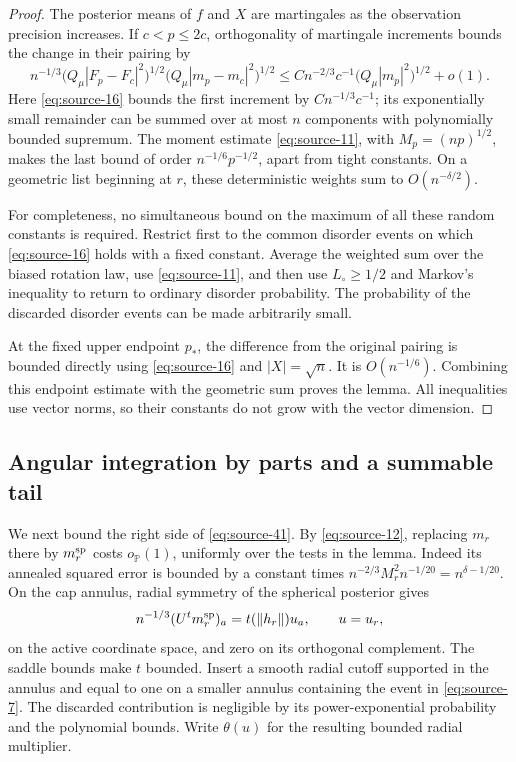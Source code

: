 \begin{proof}
The posterior means of $f$ and $X$ are martingales as the observation
precision increases.  If $c<p\leq2c$, orthogonality of martingale
increments bounds the change in their pairing by
\[
 n^{-1/3}
 \big(Q_\mu|F_p-F_c|^2\big)^{1/2}
 \big(Q_\mu|m_p-m_c|^2\big)^{1/2}
 \leq Cn^{-2/3}c^{-1}
 \big(Q_\mu|m_p|^2\big)^{1/2}+o(1).
\]
Here \eqref{eq:source-16} bounds the first increment by
$Cn^{-1/3}c^{-1}$; its exponentially small remainder can be summed
over at most $n$ components with polynomially bounded supremum.
The moment estimate \eqref{eq:source-11}, with $M_p=(np)^{1/2}$,
makes the last bound of order
$n^{-1/6}p^{-1/2}$, apart from tight constants.
On a geometric list beginning at $r$, these deterministic weights sum
to $O(n^{-\delta/2})$.

For completeness, no simultaneous bound on the maximum of all these
random constants is required.  Restrict first to the common disorder
events on which \eqref{eq:source-16} holds with a fixed constant.
Average the weighted sum over the biased rotation law, use
\eqref{eq:source-11}, and then use $L_\circ\geq1/2$ and Markov's
inequality to return to ordinary disorder probability.  The probability
of the discarded disorder events can be made arbitrarily small.

At the fixed upper endpoint $p_*$, the difference from the original
pairing is bounded directly using \eqref{eq:source-16} and
$|X|=\sqrt n$.  It is $O(n^{-1/6})$.  Combining this endpoint estimate
with the geometric sum proves the lemma.  All inequalities use vector
norms, so their constants do not grow with the vector dimension.
\end{proof}

\subsection{Angular integration by parts and a summable tail}

We next bound the right side of \eqref{eq:source-41}.  By
\eqref{eq:source-12}, replacing $m_r$ there by $m_r^{\rm sp}$ costs
$o_{\mathbb P}(1)$, uniformly over the tests in the lemma.  Indeed its
annealed squared error is bounded by a constant times
$n^{-2/3}M_r^2n^{-1/20}=n^{\delta-1/20}$.
On the cap annulus, radial symmetry of the spherical posterior gives
\[
 n^{-1/3}(U^tm_r^{\rm sp})_a=t(\|h_r\|)u_a,
 \qquad u=u_r,
\]
on the active coordinate space, and zero on its orthogonal complement.
The saddle bounds make $t$ bounded.  Insert a smooth radial cutoff
supported in the annulus and equal to one on a smaller annulus containing
the event in \eqref{eq:source-7}.  The discarded contribution is
negligible by its power-exponential probability and the polynomial
bounds.  Write $\theta(u)$ for the resulting bounded radial multiplier.


